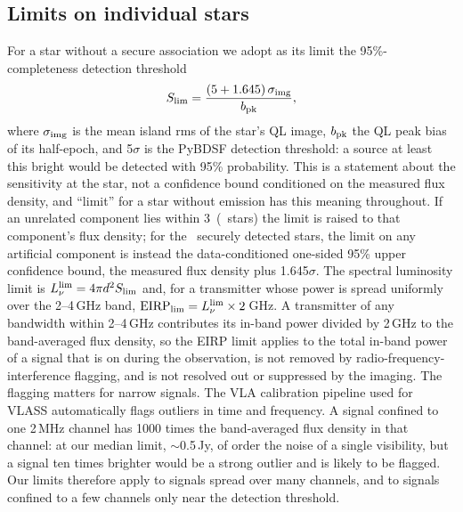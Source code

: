 \documentclass[linenumbers]{aastex702}
\newcommand{\Lnu}{L_\nu}
\begin{document}
\subsection{Limits on individual stars} \label{sec:limits_method}

For a star without a secure association we adopt as its limit the 95\%-completeness detection threshold
\begin{equation}
S_{\rm lim}=\frac{(5+1.645)\,\sigma_{\rm img}}{b_{\rm pk}},
\end{equation}
where $\sigma_{\rm img}$ is the mean island rms of the star's QL image, $b_{\rm pk}$ the QL peak bias of its half-epoch, and 5$\sigma$ is the PyBDSF detection threshold: a source at least this bright would be detected with 95\% probability. This is a statement about the sensitivity at the star, not a confidence bound conditioned on the measured flux density, and ``limit'' for a star without emission has this meaning throughout. If an unrelated component lies within 3\arcsec\ (\NConfused\ stars) the limit is raised to that component's flux density; for the \NDetected\ securely detected stars, the limit on any artificial component is instead the data-conditioned one-sided 95\% upper confidence bound, the measured flux density plus 1.645$\sigma$. The spectral luminosity limit is $\Lnu^{\rm lim}=4\pi d^2S_{\rm lim}$ and, for a transmitter whose power is spread uniformly over the 2--4\,GHz band, ${\rm EIRP}_{\rm lim}=\Lnu^{\rm lim}\times2$\,GHz. A transmitter of any bandwidth within 2--4\,GHz contributes its in-band power divided by 2\,GHz to the band-averaged flux density, so the EIRP limit applies to the total in-band power of a signal that is on during the observation, is not removed by radio-frequency-interference flagging, and is not resolved out or suppressed by the imaging. The flagging matters for narrow signals. The VLA calibration pipeline used for VLASS \citep{Lacy2020} automatically flags outliers in time and frequency. A signal confined to one 2\,MHz channel has 1000 times the band-averaged flux density in that channel: at our median limit, $\sim$0.5\,Jy, of order the noise of a single visibility, but a signal ten times brighter would be a strong outlier and is likely to be flagged. Our limits therefore apply to signals spread over many channels, and to signals confined to a few channels only near the detection threshold.
\end{document}
